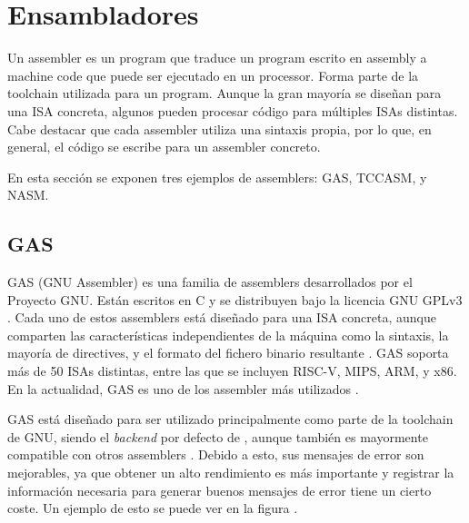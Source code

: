 
\section{Ensambladores}

Un \gls{assembler} es un \gls{program} que traduce un \gls{program} escrito en
\gls{assembly} a \gls{machine code} que puede ser ejecutado en un
\gls{processor}. Forma parte de la \gls{toolchain} utilizada para
 un \gls{program}. Aunque la gran mayoría se
diseñan para una \gls{ISA} concreta, algunos pueden procesar código para
múltiples \glspl{ISA} distintas. Cabe destacar que cada \gls{assembler} utiliza
una sintaxis propia, por lo que, en general, el código se escribe para un
\gls{assembler} concreto.

En esta sección se exponen tres ejemplos de \glspl{assembler}: GAS, TCCASM, y NASM.

\subsection{GAS}

GAS (GNU Assembler) \parencite{GNUas} es una familia de \glspl{assembler}
desarrollados por el Proyecto GNU. Están escritos en C y se distribuyen bajo la
licencia GNU GPLv3 \parencite{gpl}. Cada uno de estos \glspl{assembler} está
diseñado para una \gls{ISA} concreta, aunque comparten las características
independientes de la máquina como la sintaxis, la mayoría de \glspl{directive},
y el formato del fichero binario resultante \parencite{as-manual}. GAS soporta
más de 50 \glspl{ISA} distintas, entre las que se incluyen RISC-V, MIPS, ARM, y
x86. En la actualidad, GAS es uno de los \gls{assembler} más utilizados
\parencite{assembler-usage}.

GAS está diseñado para ser utilizado principalmente como parte de la
\gls{toolchain} de GNU, siendo el \textit{backend} por defecto de ,
aunque también es mayormente compatible con otros \glspl{assembler}
\parencite{as-manual}. Debido a esto, sus mensajes de error son mejorables, ya
que obtener un alto rendimiento es más importante y registrar la información
necesaria para generar buenos mensajes de error tiene un cierto coste. Un
ejemplo de esto se puede ver en la figura .


